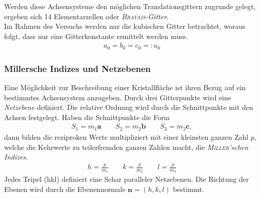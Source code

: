\documentclass[a4paper,twoside,final]{article}
\begin{document}
Werden diese Achsensysteme den möglichen Translationsgittern zugrunde gelegt, ergeben sich 14 Elementarzellen oder \textit{\textsc{Bravais}-Gitter}.\\
Im Rahmen des Versuchs werden nur die kubischen Gitter betrachtet, woraus folgt, dass nur eine Gitterkonstante ermittelt werden muss.
\begin{align}
  a_0 = b_0 = c_0 =: a_0
\end{align}

\subsubsection{Millersche Indizes und Netzebenen}
Eine Möglichkeit zur Beschreibung einer Kristallfläche ist ihren Bezug auf ein bestimmtes Achsensystem anzugeben. Durch drei Gitterpunkte wird eine \textit{Netzebene} definiert. Die relative Ordnung wird durch die Schnittpunkte mit den Achsen festgelegt. Haben die Schnittpunkte die Form
\begin{align}
  S_1 = m_1 \bm{a} \qquad S_2 = m_2 \bm{b} \qquad S_3 = m_3 \bm{c},
\end{align}
dann bilden die reziproken Werte multipliziert mit einer kleinsten ganzen Zahl $p$, welche die Kehrwerte zu teilerfremden ganzen Zahlen macht, die \textit{\textsc{Miller}'schen Indizes}.
\begin{align}
  h = \frac{p}{m_1} \qquad k = \frac{p}{m_2} \qquad l = \frac{p}{m_3}
\end{align}
Jedes Tripel (hkl) definiert eine Schar paralleler Netzebenen. Die Richtung der Ebenen wird durch die Ebenennormale $\bm{n} = (h,k,l)$ bestimmt.
\end{document}
